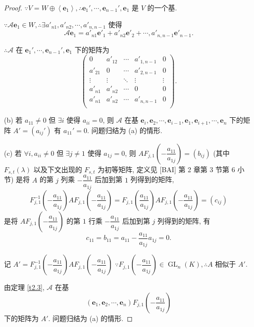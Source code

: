 \documentclass{ctexart}
\begin{document}
\begin{proof}
    $\because V=W\oplus\left<\boldsymbol{e}_1\right>,\therefore\boldsymbol{e}_1',\cdots,\boldsymbol{e}_{n-1}',\boldsymbol{e}_1$ 是 $V$ 的一个基.
    
    $\because\mathcal{A}\boldsymbol{e}_1\in W,\therefore\exists a'_{n1},a'_{n2},\cdots,a'_{n,n-1}$ 使得
    \[\mathcal{A}\boldsymbol{e}_1=a'_{n1}\boldsymbol{e}'_1+a'_{n2}\boldsymbol{e}'_2+\cdots,a'_{n,n-1}\boldsymbol{e}'_{n-1}.\]

    $\therefore\mathcal{A}$ 在 $\boldsymbol{e}_1',\cdots,\boldsymbol{e}_{n-1}',\boldsymbol{e}_1$ 下的矩阵为
    \[\begin{pmatrix}
        0 & a'_{12} & \cdots & a'_{1,n-1} & 0 \\
        a'_{21} & 0 & \cdots & a'_{2,n-1} & 0 \\
        \vdots & \vdots & \ddots & \vdots & \vdots \\
        a'_{n1} & a'_{n2} & \cdots & 0 & 0 \\
        a'_{n1} & a'_{n2} & \cdots & a'_{n,n-1} & 0 \\
    \end{pmatrix}.\]

    (b) 若 $a_{11}\neq0$ 但 $\exists i$ 使得 $a_{ii}=0$, 则 $\mathcal{A}$ 在基 $\boldsymbol{e}_i,\boldsymbol{e}_2,\cdots,\boldsymbol{e}_{i-1},\boldsymbol{e}_1,\boldsymbol{e}_{i+1},\cdots,\boldsymbol{e}_n$ 下的矩阵 $A'=(a_{ij}')$ 有 $a_{11}'=0$. 问题归结为 (a) 的情形.

    (c) 若 $\forall i,a_{ii}\neq0$ 但 $\exists j\neq 1$ 使得 $a_{1j}=0$, 则 $AF_{j,1}\left(-\dfrac{a_{11}}{a_{1j}}\right)=(b_{ij})$ (其中 $F_{s,t}(\lambda)$ 以及下文出现的 $F_{s,t}$ 为初等矩阵, 定义见 [BAI] 第 2 章第 3 节第 6 小节) 是将 $A$ 的第 $j$ 列乘 $-\dfrac{a_{11}}{a_{1j}}$ 后加到第 $1$ 列得到的矩阵,
    \[F^{-1}_{j,1}\left(-\dfrac{a_{11}}{a_{1j}}\right)AF_{j,1}\left(-\dfrac{a_{11}}{a_{1j}}\right)=F_{j,1}\left(\dfrac{a_{11}}{a_{1j}}\right)AF_{j,1}\left(-\dfrac{a_{11}}{a_{1j}}\right)=(c_{ij})\]
    是将 $AF_{j,1}\left(-\dfrac{a_{11}}{a_{1j}}\right)$ 的第 $1$ 行乘 $-\dfrac{a_{11}}{a_{1j}}$ 后加到第 $j$ 列得到的矩阵, 有
    \[c_{11}=b_{11}=a_{11}-\dfrac{a_{11}}{a_{1j}}a_{1j}=0.\]

    记 $A'=F^{-1}_{j,1}\left(-\dfrac{a_{11}}{a_{1j}}\right)AF_{j,1}\left(-\dfrac{a_{11}}{a_{1j}}\right)$ $\because F_{j,1}\left(-\dfrac{a_{11}}{a_{1j}}\right)\in\operatorname{GL}_n(K),\therefore A$ 相似于 $A'$.

    由定理 \ref{t2.3}, $\mathcal{A}$ 在基
    \[(\boldsymbol{e}_1,\boldsymbol{e}_2,\cdots,\boldsymbol{e}_n)F_{j,1}\left(-\dfrac{a_{11}}{a_{1j}}\right)\]
    下的矩阵为 $A'$. 问题归结为 (a) 的情形.


\end{proof}
\end{document}
